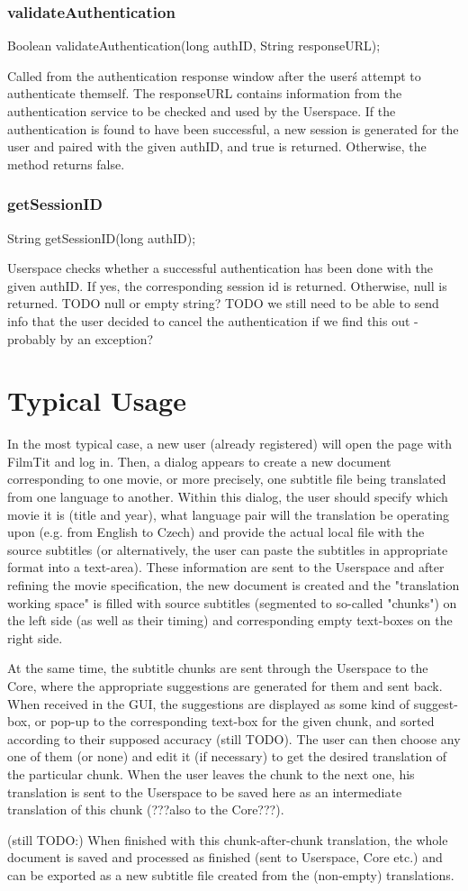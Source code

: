 \subsubsection{validateAuthentication}
    Boolean validateAuthentication(long authID, String responseURL);

Called from the authentication response window after the user\'s attempt to authenticate themself.
The responseURL contains information from the authentication service to be checked and used by the Userspace.
If the authentication is found to have been successful, a new session is generated for the user and paired with the given authID, and true is returned.
Otherwise, the method returns false.

\subsubsection{getSessionID}
    String getSessionID(long authID);

Userspace checks whether a successful authentication has been done with the given authID.
If yes, the corresponding session id is returned.
Otherwise, null is returned.
TODO null or empty string?
TODO we still need to be able to send info that the user decided to cancel the authentication if we find this out - probably by an exception?



\section{Typical Usage}
In the most typical case, a new user (already registered) will open the page with FilmTit and log in. Then, a dialog appears to create a new document corresponding to one movie, or more precisely, one subtitle file being translated from one language to another. Within this dialog, the user should specify which movie it is (title and year), what language pair will the translation be operating upon (e.g. from English to Czech) and provide the actual local file with the source subtitles (or alternatively, the user can paste the subtitles in appropriate format into a text-area). These information are sent to the Userspace and after refining the movie specification, the new document is created and the "translation working space" is filled with source subtitles (segmented to so-called "chunks") on the left side (as well as their timing) and corresponding empty text-boxes on the right side.

At the same time, the subtitle chunks are sent through the Userspace to the Core, where the appropriate suggestions are generated for them and sent back. When received in the GUI, the suggestions are displayed as some kind of suggest-box, or pop-up to the corresponding text-box for the given chunk, and sorted according to their supposed accuracy (still TODO). The user can then choose any one of them (or none) and edit it (if necessary) to get the desired translation of the particular chunk. When the user leaves the chunk to the next one, his translation is sent to the Userspace to be saved here as an intermediate translation of this chunk (???also to the Core???).

(still TODO:)
When finished with this chunk-after-chunk translation, the whole document is saved and processed as finished (sent to Userspace, Core etc.) and can be exported as a new subtitle file created from the (non-empty) translations.
